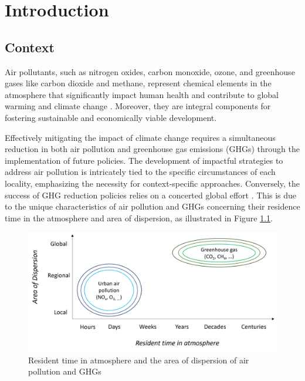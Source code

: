 \chapter{Introduction} \label{chap1}
\renewcommand{\headrulewidth}{0pt}
\lhead[\thepage]{\leftmark}
\rhead[\leftmark]{\thepage}
\cfoot[]{}

 \section{Context}

 Air pollutants, such as nitrogen oxides, carbon monoxide, ozone, and greenhouse gases like carbon dioxide and methane, represent chemical elements in the atmosphere that significantly impact human health \citep{kampa2008human} and contribute to global warming and climate change \citep{haines2006climate}. Moreover, they are integral components for fostering sustainable and economically viable development. \par

Effectively mitigating the impact of climate change requires a simultaneous reduction in both air pollution and greenhouse gas emissions (GHGs) through the implementation of future policies. The development of impactful strategies to address air pollution is intricately tied to the specific circumstances of each locality, emphasizing the necessity for context-specific approaches. Conversely, the success of GHG reduction policies relies on a concerted global effort \citep{keohane2011regime}. This is due to the unique characteristics of air pollution and GHGs concerning their residence time in the atmosphere and area of dispersion, as illustrated in Figure \ref{fig:chap1_fig1}.\par

\begin{figure}[tbh!]
    \centering
    \includegraphics[width=\textwidth]{figs/chap1/residenttime.png}
    \caption[Resident time in atmosphere and the area of dispersion]{Resident time in atmosphere and the area of dispersion of air pollution and GHGs}
    \label{fig:chap1_fig1}
\end{figure}

